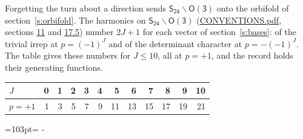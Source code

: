 \documentclass[10pt,a4paper]{article}
\newcommand{\needspace}[1]{\par\penalty-100\begingroup\dimen0=#1\relax\dimen2=\pagegoal
  \advance\dimen2-\pagetotal\ifdim\dimen0>\dimen2\relax\ifdim\dimen2>0pt\vfil\break\fi\fi
  \endgroup}
\numberwithin{equation}{section}
\newcommand{\grp}[1]{\mathsf{#1}}
\begin{document}
Forgetting the turn about a direction sends $\grp{S_{24}}\backslash\grp{O(3)}$ onto the orbifold of section~\ref{s:orbifold}.
The harmonics on $\grp{S_{24}}\backslash\grp{O(3)}$ (\href{../../CONVENTIONS.pdf}{CONVENTIONS.pdf}, sections \href{../../CONVENTIONS.pdf\#conv.11}{11} and \href{../../CONVENTIONS.pdf\#conv.17.5}{17.5}) number $2J + 1$ for each vector of section~\ref{s:bases}: of the trivial irrep at $p = (-1)^J$ and of the determinant character at $p = -(-1)^J$. The table gives these numbers for $J \le 10$, all at $p = +1$, and the record holds their generating functions.
{\small\setlength{\tabcolsep}{4pt}\begin{longtable}{@{}lrrrrrrrrrrr@{}}\toprule
$J$ & 0 & 1 & 2 & 3 & 4 & 5 & 6 & 7 & 8 & 9 & 10\\\midrule\endhead
\bottomrule\endfoot\endlastfoot
$p = +1$ & 1 & 3 & 5 & 7 & 9 & 11 & 13 & 15 & 17 & 19 & 21\\
\bottomrule\end{longtable}}
\needspace{103pt}
\end{document}

